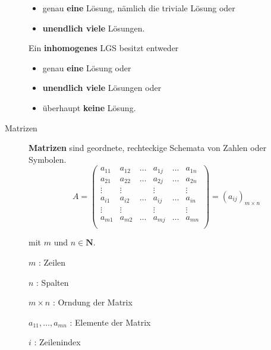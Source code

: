 \documentclass[
  ngerman,
  a4paper,
  landscape, fontsize=9pt, version=first, enabledeprecatedfontcommands,
  DIV=6]{scrartcl}
\providecommand{\tightlist}{%
  \setlength{\itemsep}{0pt}\setlength{\parskip}{0pt}}
\begin{document}
\begin{multicols}{3}
\begin{description}
\begin{itemize}
\tightlist
\item
  genau \textbf{eine} Lösung, nämlich die triviale Lösung oder
\end{itemize}

\begin{itemize}
\tightlist
\item
  \textbf{unendlich viele} Lösungen.
\end{itemize}

Ein \textbf{inhomogenes} LGS besitzt entweder

\begin{itemize}
\tightlist
\item
  genau \textbf{eine} Lösung oder
\end{itemize}

\begin{itemize}
\tightlist
\item
  \textbf{unendlich viele} Lösungen oder
\end{itemize}

\begin{itemize}
\tightlist
\item
  überhaupt \textbf{keine} Lösung.
\end{itemize}
\item[Matrizen]
\textbf{Matrizen} sind geordnete, rechteckige Schemata von Zahlen oder
Symbolen. \[\renewcommand{\arraystretch}{.9}
A=\begin{pmatrix}
a_{11} & a_{12} & \ldots & a_{1j} &\ldots& a_{1n}\\
a_{21} & a_{22} & \ldots & a_{2j} & \ldots & a_{2n}\\
\vdots & \vdots & & \vdots & &\vdots \\
a_{i1} & a_{i2} & \ldots & a_{ij} & \ldots & a_{in}\\
\vdots & \vdots & & \vdots & &\vdots \\
a_{m1} & a_{m2} & \ldots & a_{mj} & \ldots & a_{mn}\\
\end{pmatrix}
   = {(a_{ij})}_{m\times n}\]

mit \(m\) und \(n \in \mathbf{N}\).

\(m\) : Zeilen

\(n\) : Spalten

\(m\times n\) : Orndung der Matrix

\(a_{11},\ldots,a_{mn}\) : Elemente der Matrix

\(i\) : Zeilenindex


\end{description}
\end{multicols}
\end{document}
